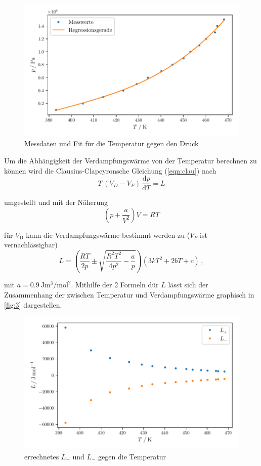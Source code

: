 \begin{figure}
    \centering
    \caption{Messdaten und Fit für die Temperatur gegen den Druck}
    \label{fig:2}
    \includegraphics{Daten/hochdruck.pdf}
\end{figure}

\noindent
Um die Abhängigkeit der Verdampfungswärme von der Temperatur berechnen zu können wird die Clausius-Clapeyronsche Gleichung (\ref{eqn:clau}) nach
\begin{equation}
    T \, (V_D - V_F) \, \frac{\text{d}p}{\text{d}T} = L 
\end{equation}

\noindent
umgestellt und mit der Näherung 
\begin{equation*}
    \left( p + \frac{a}{V^2}\right) V = RT
\end{equation*}

\noindent
für $V_\text{D}$ kann die Verdampfungswärme bestimmt werden zu ($V_F$ ist vernachlässigbar)
\begin{equation}
    L = \left( \frac{RT}{2p} \pm \sqrt{\frac{R^2T^2}{4p^2} - \frac{a}{p}}\right)\left( 3kT^2 + 2bT + c \right) \, ,
\end{equation} 

\noindent
mit $a = \SI{0.9}{\joule\metre\tothe{3}\per\mole\squared}$. Mithilfe der 2 Formeln dür $L$ lässt sich der Zusammenhang der zwischen Temperatur und Verdampfungswärme graphisch 
in \autoref{fig:3} dargestellen.

\begin{figure}
    \centering
    \caption{errechnetes $L_+$ und $L_-$ gegen die Temperatur}
    \label{fig:3}
    \includegraphics{Daten/zeitabhaengigkeit.pdf}
\end{figure}

